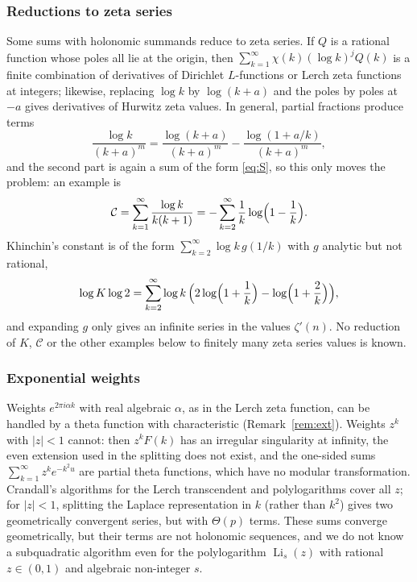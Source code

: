 \documentclass[11pt]{amsart}
\theoremstyle{definition}
\theoremstyle{remark}
\newcommand{\Li}{\operatorname{Li}}
\begin{document}
\subsubsection{Reductions to zeta series}
Some sums with holonomic summands reduce to zeta series. If $Q$ is a rational function whose poles all lie
at the origin, then $\sum_{k=1}^{\infty} \chi(k)(\log k)^jQ(k)$ is a finite combination of derivatives of Dirichlet $L$-functions
or Lerch zeta functions at integers; likewise, replacing $\log k$ by $\log(k+a)$ and the poles by poles at $-a$ gives
derivatives of Hurwitz zeta values. In general, partial fractions produce terms
\[
  \frac{\log k}{(k+a)^m} = \frac{\log(k+a)}{(k+a)^m} - \frac{\log(1+a/k)}{(k+a)^m},
\]
and the second part is again a sum of the form \eqref{eq:S}, so this only moves the problem: an example is
\[
  \mathcal C = \sum_{k=1}^{\infty}\frac{\log k}{k(k+1)} = -\sum_{k=2}^{\infty}\frac1k\log\Bigl(1-\frac1k\Bigr).
\]
Khinchin's constant is of
the form $\sum_{k=2}^{\infty} \log k\, g(1/k)$ with $g$ analytic but not rational,
\[
  \log K\log 2 = \sum_{k=2}^{\infty}\log k\,\Bigl(2\log\Bigl(1+\frac1k\Bigr) - \log\Bigl(1+\frac2k\Bigr)\Bigr),
\]
and expanding $g$ only gives an infinite series in the values $\zeta'(n)$. No reduction of $K$, $\mathcal C$
or the other examples below to finitely many zeta series values is known.

\subsubsection{Exponential weights}
Weights $e^{2\pi i\alpha k}$ with real algebraic $\alpha$, as in the Lerch zeta function, can be handled by a theta
function with characteristic (Remark~\ref{rem:ext}). Weights $z^k$ with $|z| < 1$ cannot: then $z^kF(k)$ has an
irregular singularity at infinity, the even extension used in the splitting does not exist, and the one-sided
sums $\sum_{k=1}^{\infty}z^ke^{-k^2u}$ are partial theta functions, which have no modular transformation. Crandall's
algorithms for the Lerch transcendent and polylogarithms \cite{Cra12} cover all $z$; for $|z| < 1$, splitting the
Laplace representation in $k$ (rather than $k^2$) gives two geometrically convergent series, but with $\Theta(p)$
terms. These sums converge geometrically, but
their terms are not holonomic sequences, and we do not know a subquadratic algorithm even for the polylogarithm
$\Li_s(z)$ with rational $z \in (0, 1)$ and algebraic non-integer $s$.

\end{document}
